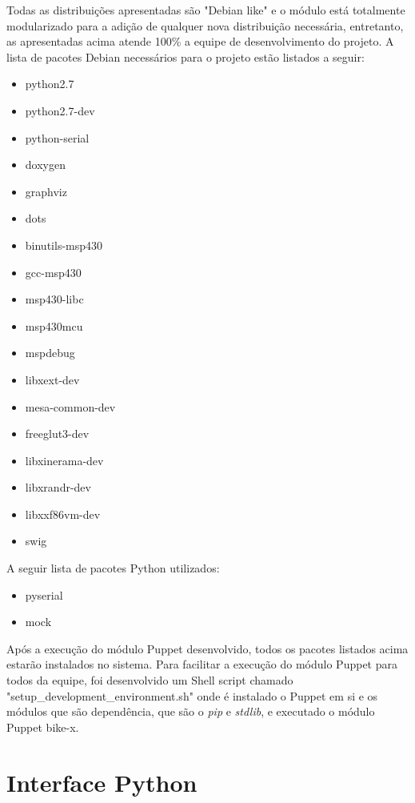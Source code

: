 Todas as distribuições apresentadas são "Debian like" e o módulo está totalmente modularizado para a adição de qualquer nova distribuição necessária, entretanto, as apresentadas acima atende 100\% a equipe de desenvolvimento do projeto. A lista de pacotes Debian necessários para o projeto estão listados a seguir:

\begin{multicols}{2}
\begin{itemize}
\item python2.7
\item python2.7-dev
\item python-serial
\item doxygen
\item graphviz
\item dots
\item binutils-msp430
\item gcc-msp430
\item msp430-libc
\item msp430mcu
\item mspdebug
\item libxext-dev
\item mesa-common-dev
\item freeglut3-dev
\item libxinerama-dev
\item libxrandr-dev
\item libxxf86vm-dev
\item swig
\end{itemize}
\end{multicols}

A seguir lista de pacotes Python utilizados:

\begin{itemize}
\item pyserial
\item mock
\end{itemize}

Após a execução do módulo Puppet desenvolvido, todos os pacotes listados acima estarão instalados no sistema. Para facilitar a execução do módulo Puppet para todos da equipe, foi desenvolvido um Shell script chamado "setup\_development\_environment.sh" onde é instalado o Puppet em si e os módulos que são dependência, que são o \textit{pip} e \textit{stdlib}, e executado o módulo Puppet bike-x.


\section{Interface Python} %
\label{sec:interface_python}

